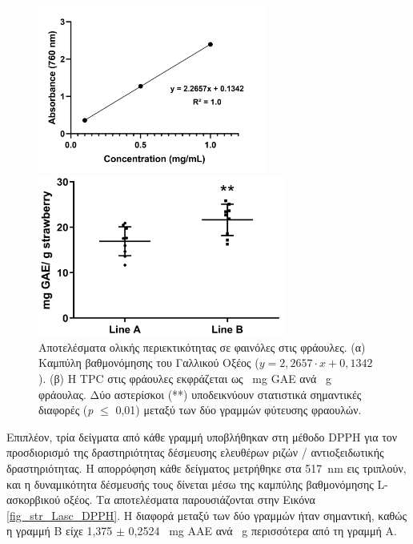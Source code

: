 \documentclass[12pt, a4paper]{report} %
\newcommand{\english}{\foreignlanguage{english}}
\begin{document}
\begin{figure}[H]
    \begin{minipage}[c]{.5\textwidth}
\centering
      \includegraphics[width=0.9\linewidth,height=155pt]{GA.png}
      \caption*{\hspace{35pt}(α)}{}
    \end{minipage}%
    \begin{minipage}[c]{0.5\textwidth}
\centering
      \includegraphics[width=0.9\linewidth,height=150pt]{TPC.png}
      \caption*{\hspace{35pt}(β)}{}
    \end{minipage}
\caption{Αποτελέσματα ολικής περιεκτικότητας σε φαινόλες στις φράουλες. (α) Καμπύλη βαθμονόμησης του Γαλλικού 
Οξέος ($y = 2,2657 \cdot x + 0,1342$). (β) Η \english{TPC} στις φράουλες εκφράζεται ως \SI{}{\milli\gram} 
\english{GAE} ανά \SI{}{\gram} φράουλας. Δύο αστερίσκοι (**) υποδεικνύουν στατιστικά σημαντικές διαφορές 
(\english{\emph{p} $\leq$} 0,01) μεταξύ των δύο γραμμών φύτευσης φραουλών.}
\label{fig_str_GA_TPC}
\end{figure}

Επιπλέον, τρία δείγματα από κάθε γραμμή υποβλήθηκαν στη μέθοδο \english{DPPH} για τον προσδιορισμό της δραστηριότητας 
δέσμευσης ελευθέρων ριζών / αντιοξειδωτικής δραστηριότητας. Η απορρόφηση κάθε δείγματος μετρήθηκε στα 
\SI{517}{\nano\meter} εις τριπλούν, και η δυναμικότητα δέσμευσής τους δίνεται μέσω της καμπύλης βαθμονόμησης 
\english{L}-ασκορβικού οξέος. Τα αποτελέσματα παρουσιάζονται στην Εικόνα \ref{fig_str_Lasc_DPPH}. Η διαφορά μεταξύ των δύο γραμμών ήταν 
σημαντική, καθώς η γραμμή Β είχε 1,375 $\pm$ 0,2524 \SI{}{\milli\gram} \english{AAE} ανά \SI{}{\gram} περισσότερα από 
τη γραμμή Α.
\end{document}
